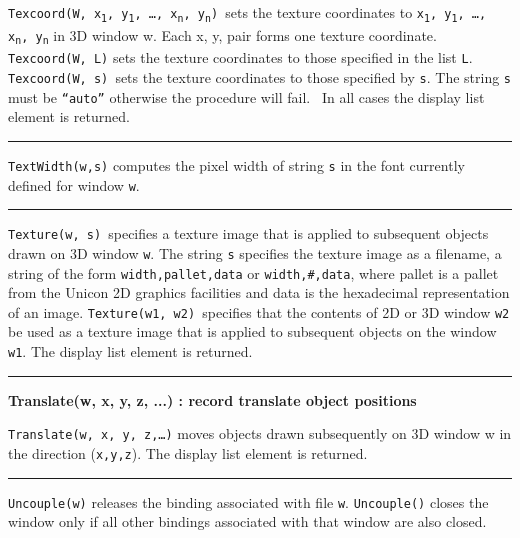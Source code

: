 \noindent
\texttt{Texcoord(W, x}\texttt{\textsubscript{1}}\texttt{,
y}\texttt{\textsubscript{1}}\texttt{, {\dots},
x}\texttt{\textsubscript{n}}\texttt{,
y}\texttt{\textsubscript{n}}\texttt{) }sets the texture coordinates to
\texttt{x}\texttt{\textsubscript{1}}\texttt{,
y}\texttt{\textsubscript{1}}\texttt{, {\dots},
x}\texttt{\textsubscript{n}}\texttt{, y}\texttt{\textsubscript{n}} in
3D window w. Each x, y, pair forms one texture coordinate.
\texttt{Texcoord(W, L)} sets the texture coordinates to those specified
in the list \texttt{L}. \texttt{Texcoord(W, s) }sets the texture
coordinates to those specified by \texttt{s}. The string \texttt{s}
must be \texttt{{\textquotedblleft}auto{\textquotedblright}} otherwise
the procedure will fail. \ In all cases the display list element is
returned.

\bigskip\hrule\vspace{0.1cm}

\noindent
\texttt{TextWidth(w,s)} computes the pixel width of string \texttt{s} in
the font currently defined for window \texttt{w}.

\bigskip\hrule\vspace{0.1cm}

\noindent
\texttt{Texture(w, s) }specifies a texture image that is applied to
subsequent objects drawn on 3D window \texttt{w}. The string \texttt{s}
specifies the texture image as a filename, a string of the form
\texttt{width,pallet,data} or \texttt{width,\#,data}, where pallet is a
pallet from the Unicon 2D graphics facilities and data is the
hexadecimal representation of an image. \texttt{Texture(w1, w2)
}specifies that the contents of 2D or 3D window \texttt{w2} be used as
a texture image that is applied to subsequent objects on the window
\texttt{w1}. The display list element is returned.

\bigskip\hrule\vspace{0.1cm}
\noindent
{\bf Translate(w, x, y, z, ...) : record \hfill translate object positions}

\noindent
\texttt{Translate(w, x, y, z,{\dots})} moves objects drawn subsequently
on 3D window w in the direction (\texttt{x,y,z}). The display list
element is returned.

\bigskip\hrule\vspace{0.1cm}

\noindent
\texttt{Uncouple(w)} releases the binding associated with file
\texttt{w}. \texttt{Uncouple()} closes the window only if all other
bindings associated with that window are also closed.


